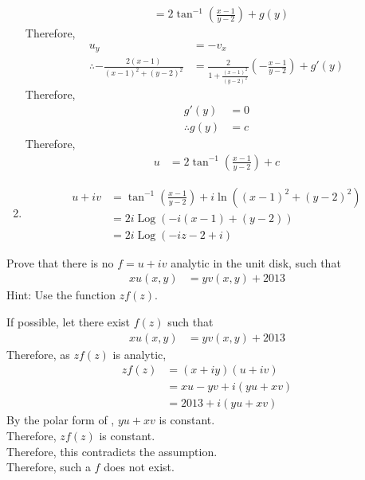 \documentclass[titlepage, fleqn, a4paper, 12pt, twoside]{article}
\theoremstyle{definition}
\theoremstyle{theorem}
\DeclareMathOperator{\Log}{Log}
\begin{document}
\begin{solution}
\begin{enumerate}[leftmargin=*]
\begin{align*}
                                  & = 2 \tan^{-1}\left( \frac{x - 1}{y - 2} \right) + g(y)
			\end{align*}
			Therefore,
			\begin{align*}
				u_y                                                 & = -v_x \\
				\therefore -\frac{2 (x - 1)}{(x - 1)^2 + (y - 2)^2} & = \frac{2}{1 + \frac{(x - 1)^2}{(y - 2)^2}} \left( -\frac{x - 1}{y - 2} \right) + g'(y)
			\end{align*}
			Therefore,
			\begin{align*}
				g'(y)           & = 0 \\
				\therefore g(y) & = c
			\end{align*}
			Therefore,
			\begin{align*}
				u & = 2 \tan^{-1}\left( \frac{x - 1}{y - 2} \right) + c
			\end{align*}
		\item
			\begin{align*}
				u + i v & = \tan^{-1}\left( \frac{x - 1}{y - 2} \right) + i \ln\left( (x - 1)^2 + (y - 2)^2 \right) \\
                                        & = 2 i \Log\left( -i (x - 1) + (y - 2) \right)                                             \\
                                        & = 2 i \Log\left( -i z - 2 + i \right)
			\end{align*}
	\end{enumerate}
\end{solution}

\begin{question}
	Prove that there is no $f = u + i v$ analytic in the unit disk, such that
	\begin{align*}
		x u(x,y) & = y v(x,y) + 2013
	\end{align*}
	Hint: Use the function $z f(z)$.
\end{question}

\begin{solution}
	If possible, let there exist $f(z)$ such that
	\begin{align*}
		x u(x,y) & = y v(x,y) + 2013
	\end{align*}
	Therefore, as $z f(z)$ is analytic,
	\begin{align*}
		z f(z) & = (x + i y) (u + i v)       \\
                       & = x u - y v + i (y u + x v) \\
                       & = 2013 + i (y u + x v)
	\end{align*}
	By the polar form of , $y u + x v$ is constant.\\
	Therefore, $z f(z)$ is constant.\\
	Therefore, this contradicts the assumption.\\
	Therefore, such a $f$ does not exist.
\end{solution}
\end{document}

